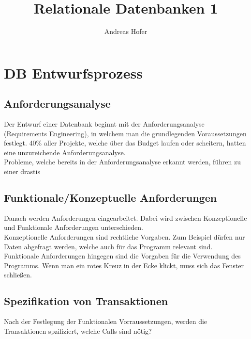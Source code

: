 \documentclass{article}
\title{\vspace{-1cm}Relationale Datenbanken 1}
\author{Andreas Hofer}
\begin{document}
	\maketitle
	\tableofcontents
	\newpage
	\section{DB Entwurfsprozess}
	\subsection{Anforderungsanalyse}
	Der Entwurf einer Datenbank beginnt mit der Anforderungsanalyse (Requirements Engineering), in welchem man die grundlegenden Voraussetzungen festlegt. 40\% aller Projekte, welche über das Budget laufen oder scheitern, hatten eine unzureichende Anforderungsanalyse. \\
	Probleme, welche bereits in der Anforderungsanalyse erkannt werden, führen zu einer drastis
	\subsection{Funktionale/Konzeptuelle Anforderungen}
	Danach werden Anforderungen eingearbeitet. Dabei wird zwischen Konzeptionelle und Funktionale Anforderungen unterschieden. \\
	Konzeptionelle Anforderungen sind rechtliche Vorgaben. Zum Beispiel dürfen nur Daten abgefragt werden, welche auch für das Programm relevant sind. \\
	Funktionale Anforderungen hingegen sind die Vorgaben für die Verwendung des Programms. Wenn man ein rotes Kreuz in der Ecke klickt, muss sich das Fenster schließen.
	\subsection{Spezifikation von Transaktionen}
	Nach der Festlegung der Funktionalen Vorraussetzungen, werden die Transaktionen spzifiziert, welche Calls sind nötig?
\end{document}
